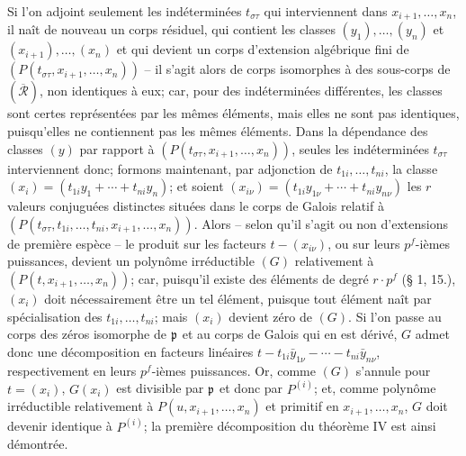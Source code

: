 Si l'on adjoint seulement les indéterminées $t_{\sigma\tau}$ qui interviennent dans $x_{i+1},\ldots,x_n$, il naît de nouveau un corps résiduel, qui contient les classes $(y_1),\ldots,(y_n)$ et $(x_{i+1}),\ldots,(x_n)$ et qui devient un corps d'extension algébrique fini de $(P(t_{\sigma\tau},x_{i+1},\ldots,x_n))$ -- il s'agit alors de corps isomorphes à des sous-corps de $(\overline{\mathcal R})$, non identiques à eux; car, pour des indéterminées différentes, les classes sont certes représentées par les mêmes éléments, mais elles ne sont pas identiques, puisqu'elles ne contiennent pas les mêmes éléments. Dans la dépendance des classes $(y)$ par rapport à $(P(t_{\sigma\tau},x_{i+1},\ldots,x_n))$, seules les indéterminées $t_{\sigma\tau}$ interviennent donc; formons maintenant, par adjonction de $t_{1i},\ldots,t_{ni}$, la classe $(x_i)=(t_{1i}y_1+\cdots+t_{ni}y_n)$; et soient $(x_{i\nu})=(t_{1i}y_{1\nu}+\cdots+t_{ni}y_{n\nu})$ les $r$ valeurs conjuguées distinctes situées dans le corps de Galois relatif à $(P(t_{\sigma\tau},t_{1i},\ldots,t_{ni},x_{i+1},\ldots,x_n))$. Alors -- selon qu'il s'agit ou non d'extensions de première espèce -- le produit sur les facteurs $t-(x_{i\nu})$, ou sur leurs $p^f$-ièmes puissances, devient un polynôme irréductible $(G)$ relativement à $(P(t,x_{i+1},\ldots,x_n))$; car, puisqu'il existe des éléments de degré $r\cdot p^f$ (\S{} 1, 15.), $(x_i)$ doit nécessairement être un tel élément, puisque tout élément naît par spécialisation des $t_{1i},\ldots,t_{ni}$; mais $(x_i)$ devient zéro de $(G)$. Si l'on passe au corps des zéros isomorphe de $\mathfrak p$ et au corps de Galois qui en est dérivé, $G$ admet donc une décomposition en facteurs linéaires $t-t_{1i}\bar y_{1\nu}-\cdots-t_{ni}\bar y_{n\nu}$, respectivement en leurs $p^f$-ièmes puissances. Or, comme $(G)$ s'annule pour $t=(x_i)$, $G(x_i)$ est divisible par $\mathfrak p$ et donc par $P^{(i)}$; et, comme polynôme irréductible relativement à $P(u,x_{i+1},\ldots,x_n)$ et primitif en $x_{i+1},\ldots,x_n$, $G$ doit devenir identique à $P^{(i)}$; la première décomposition du théorème IV est ainsi démontrée.

